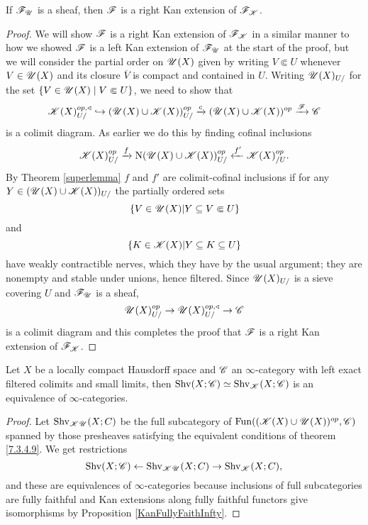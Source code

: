 \documentclass[../../thesis.tex]{subfiles}
\begin{document}
\begin{lemma}
    If $\mathscr{F}_{\mathscr{U}}$ is a sheaf, then $\mathscr{F}$ is a right Kan extension of $\mathscr{F}_{\mathscr{K}}$.
\end{lemma}
\begin{proof}
    We will show $\mathscr{F}$ is a right Kan extension of $\mathscr{F}_{\mathscr{K}}$ in a similar manner to how we showed $\mathscr{F}$ is a left Kan extension of $\mathscr{F}_{\mathscr{U}}$ at the start of the proof, but we will consider the partial order on $\mathscr{U}(X)$ given by writing $V\Subset U$ whenever $V\in \mathscr{U}(X)$ and its closure $\overline{V}$ is compact and contained in $U$.
    Writing $\mathscr{U}(X)_{U/}$ for the set $\{V\in \mathscr{U}(X) \mid V\Subset U\}$, we need to show that
    \[
        \mathscr{K}(X)_{U/}^{op,\triangleleft} \hookrightarrow (\mathscr{U}(X) \cup \mathscr{K}(X))_{U/}^{op} \xrightarrow{c}(\mathscr{U}(X) \cup \mathscr{K}(X))^{op} \xrightarrow{\mathscr{F}} \mathscr{C}
    \]
    is a colimit diagram.
    As earlier we do this by finding cofinal inclusions
    \[
        \mathscr{K}(X)_{U/}^{op} \xrightarrow{f}\mathrm{N}(\mathscr{U}(X) \cup \mathscr{K}(X))_{U/}^{op} \xleftarrow{f'} \mathscr{K}(X)_{/U}^{op}.
    \]
    By Theorem \ref{superlemma} $f$ and $f'$ are colimit-cofinal inclusions if for any $Y\in (\mathscr{U}(X) \cup \mathscr{K}(X))_{U/}$ the partially ordered sets
    \[
        \{ V \in \mathscr{U}(X) |Y \subseteq V \Subset U \}
    \]
    and
    \[
        \{ K \in \mathscr{K}(X) |Y \subseteq K \subseteq U \}
    \]
    have weakly contractible nerves, which they have by the usual argument; they are nonempty and stable under unions, hence filtered.
    Since $\mathscr{U}(X)_{U/}$ is a sieve covering $U$ and $\mathscr{F}_{\mathscr{U}}$ is a sheaf,
    \[
        \mathscr{U}(X)_{U/}^{op} \to \mathscr{U}(X)_{U/}^{op, \triangleleft} \to \mathscr{C}
    \]
    is a colimit diagram and this completes the proof that $\mathscr{F}$ is a right Kan extension of $\mathscr{F}_{\mathscr{K}}$.
\end{proof}
\begin{corollary}\label{7.3.4.10}
    Let $X$ be a locally compact Hausdorff space and $\mathscr{C}$ an $\infty$-category with left exact filtered colimits and small limits, then $\mathrm{Shv}(X;\mathscr{C}) \simeq \mathrm{Shv}_{\mathscr{K}}(X;\mathscr{C})$ is an equivalence of $\infty$-categories.
\end{corollary}
\begin{proof}
    Let $\mathrm{Shv}_{\mathscr{K}\mathscr{U}}(X;C)$ be the full subcategory of $\mathrm{Fun}((\mathscr{K}(X)\cup \mathscr{U}(X))^{op},\mathscr{C})$ spanned by those presheaves satisfying the equivalent conditions of theorem \ref{7.3.4.9}. We get restrictions
    \[
        \mathrm{Shv}(X;\mathscr{C}) \leftarrow \mathrm{Shv}_{\mathscr{K}\mathscr{U}}(X;C) \to \mathrm{Shv}_{\mathscr{K}}(X;C),
    \]
    and these are equivalences of $\infty$-categories because inclusions of full subcategories are fully faithful and Kan extensions along fully faithful functors give isomorphisms by Proposition \ref{KanFullyFaithInfty}.
\end{proof}
\end{document}

